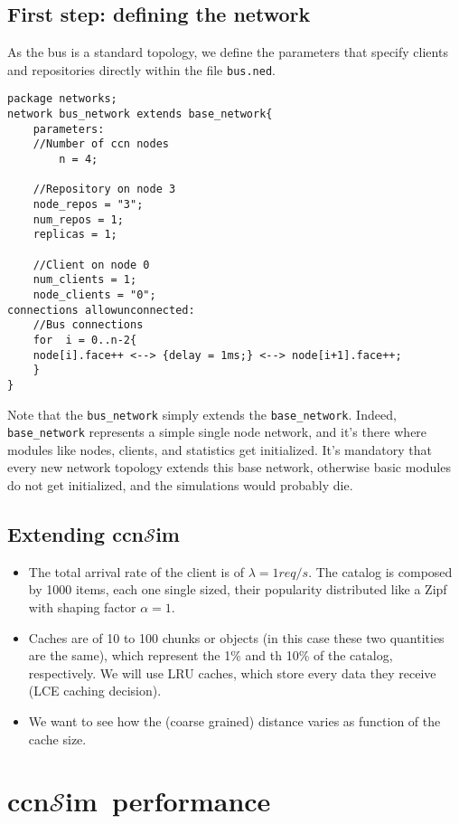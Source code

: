 \documentclass{article}
\newcommand{\ccnsim}{ccn$\mathcal{S}$im}
\begin{document}
\subsection{First step: defining the network}
As the bus is a standard topology, we define the parameters that specify clients and repositories directly within the file \verb|bus.ned|. 
\begin{Verbatim}[frame=single]
package networks;
network bus_network extends base_network{
    parameters:
	//Number of ccn nodes
    	n = 4; 

	//Repository on node 3
	node_repos = "3";
	num_repos = 1;
	replicas = 1;

	//Client on node 0
	num_clients = 1;
	node_clients = "0";
connections allowunconnected:
    //Bus connections
    for  i = 0..n-2{
	node[i].face++ <--> {delay = 1ms;} <--> node[i+1].face++;
    }
}
\end{Verbatim}
Note that the \verb|bus_network| simply extends the \verb|base_network|. Indeed, \verb|base_network| represents a simple single node network, and it's there where modules like nodes, clients, and statistics get initialized. It's mandatory that every new network topology extends this base network, otherwise basic modules do not get initialized, and the simulations would probably die. 
\subsection{Extending \ccnsim}

\begin{itemize}
    \item The total arrival rate of the client is of $\lambda=1req/s$. The catalog is composed by 1000 items, each one single sized, their popularity distributed like a Zipf with shaping factor $\alpha=1$. 
    \item Caches are of 10 to 100 chunks or objects (in this case these two quantities are the same), which represent the 1\% and th 10\% of the catalog, respectively. We will use LRU caches, which store every data they receive (LCE caching decision). 
    \item We want to see how the (coarse grained) distance varies as function of the cache size. 
\end{itemize}
\section{\ccnsim\ performance}


\end{document}
